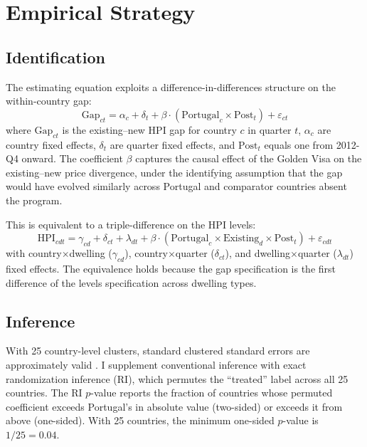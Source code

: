 \documentclass[12pt]{article}
\begin{document}
\section{Empirical Strategy}

\subsection{Identification}

The estimating equation exploits a difference-in-differences structure on the within-country gap:
\begin{equation}
\text{Gap}_{ct} = \alpha_c + \delta_t + \beta \cdot (\text{Portugal}_c \times \text{Post}_t) + \varepsilon_{ct}
\label{eq:dd}
\end{equation}
where $\text{Gap}_{ct}$ is the existing--new HPI gap for country $c$ in quarter $t$, $\alpha_c$ are country fixed effects, $\delta_t$ are quarter fixed effects, and $\text{Post}_t$ equals one from 2012-Q4 onward. The coefficient $\beta$ captures the causal effect of the Golden Visa on the existing--new price divergence, under the identifying assumption that the gap would have evolved similarly across Portugal and comparator countries absent the program.

This is equivalent to a triple-difference on the HPI levels:
\begin{equation}
\text{HPI}_{cdt} = \gamma_{cd} + \delta_{ct} + \lambda_{dt} + \beta \cdot (\text{Portugal}_c \times \text{Existing}_d \times \text{Post}_t) + \varepsilon_{cdt}
\label{eq:ddd}
\end{equation}
with country$\times$dwelling ($\gamma_{cd}$), country$\times$quarter ($\delta_{ct}$), and dwelling$\times$quarter ($\lambda_{dt}$) fixed effects. The equivalence holds because the gap specification is the first difference of the levels specification across dwelling types.

\subsection{Inference}

With 25 country-level clusters, standard clustered standard errors are approximately valid \citep{CameronGelbachMiller2008}. I supplement conventional inference with exact randomization inference (RI), which permutes the ``treated'' label across all 25 countries. The RI $p$-value reports the fraction of countries whose permuted coefficient exceeds Portugal's in absolute value (two-sided) or exceeds it from above (one-sided). With 25 countries, the minimum one-sided $p$-value is $1/25 = 0.04$.
\end{document}
